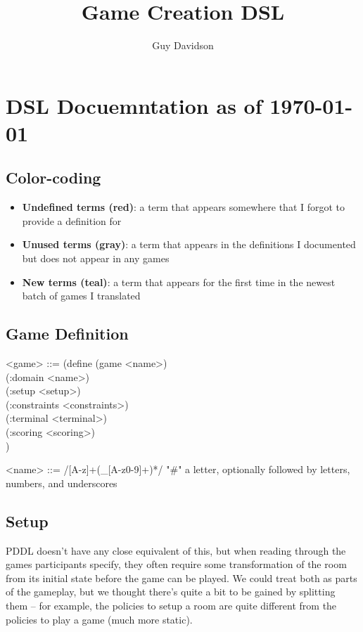 \documentclass{article}
\title{Game Creation DSL}
\author{Guy Davidson}
\begin{document}
\maketitle

\section{DSL Docuemntation as of \today}

\subsection*{Color-coding}
\begin{itemize}
\item {\color{red} \textbf{Undefined terms (red)}}: a term that appears somewhere that I forgot to provide a definition for
\item {\color{gray} \textbf{Unused terms (gray)}}: a term that appears in the definitions I documented but does not appear in any games
\item {\color{teal} \textbf{New terms (teal)}}: a term that appears for the first time in the newest batch of games I translated
\end{itemize}
\subsection{Game Definition}
\begin{grammar}
<game> ::= (define (game <name>) \\
  (:domain <name>) \\
  (:setup <setup>) \\
  (:constraints <constraints>) \\
  (:terminal <terminal>) \\
  (:scoring <scoring>) \\)

<name> ::= /[A-z]+(_[A-z0-9]+)*/ "#" a letter, optionally followed by letters, numbers, and underscores
\end{grammar}

\subsection{Setup}
PDDL doesn't have any close equivalent of this, but when reading through the games participants specify, 
        they often require some transformation of the room from its initial state before the game can be played.
        We could treat both as parts of the gameplay, but we thought there's quite a bit to be gained by splitting them -- for example,
        the policies to setup a room are quite different from the policies to play a game (much more static). \\
\end{document}
